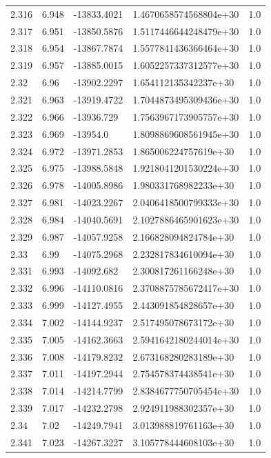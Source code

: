\begin{tabular}{lllll}
2.316 & 6.948 & -13833.4021 & 1.4670658574568804e+30 & 1.0 \\
2.317 & 6.951 & -13850.5876 & 1.5117446644248479e+30 & 1.0 \\
2.318 & 6.954 & -13867.7874 & 1.5577841436366464e+30 & 1.0 \\
2.319 & 6.957 & -13885.0015 & 1.6052257337312577e+30 & 1.0 \\
2.32 & 6.96 & -13902.2297 & 1.654112135342237e+30 & 1.0 \\
2.321 & 6.963 & -13919.4722 & 1.7044873495309436e+30 & 1.0 \\
2.322 & 6.966 & -13936.729 & 1.7563967173905757e+30 & 1.0 \\
2.323 & 6.969 & -13954.0 & 1.8098869608561945e+30 & 1.0 \\
2.324 & 6.972 & -13971.2853 & 1.865006224757619e+30 & 1.0 \\
2.325 & 6.975 & -13988.5848 & 1.9218041201530224e+30 & 1.0 \\
2.326 & 6.978 & -14005.8986 & 1.980331768982233e+30 & 1.0 \\
2.327 & 6.981 & -14023.2267 & 2.0406418500799333e+30 & 1.0 \\
2.328 & 6.984 & -14040.5691 & 2.1027886465901623e+30 & 1.0 \\
2.329 & 6.987 & -14057.9258 & 2.166828094824784e+30 & 1.0 \\
2.33 & 6.99 & -14075.2968 & 2.232817834610094e+30 & 1.0 \\
2.331 & 6.993 & -14092.682 & 2.300817261166248e+30 & 1.0 \\
2.332 & 6.996 & -14110.0816 & 2.3708875785672417e+30 & 1.0 \\
2.333 & 6.999 & -14127.4955 & 2.443091854828657e+30 & 1.0 \\
2.334 & 7.002 & -14144.9237 & 2.517495078673172e+30 & 1.0 \\
2.335 & 7.005 & -14162.3663 & 2.5941642180244014e+30 & 1.0 \\
2.336 & 7.008 & -14179.8232 & 2.673168280283189e+30 & 1.0 \\
2.337 & 7.011 & -14197.2944 & 2.754578374438541e+30 & 1.0 \\
2.338 & 7.014 & -14214.7799 & 2.8384677750705454e+30 & 1.0 \\
2.339 & 7.017 & -14232.2798 & 2.924911988302357e+30 & 1.0 \\
2.34 & 7.02 & -14249.7941 & 3.013988819761163e+30 & 1.0 \\
2.341 & 7.023 & -14267.3227 & 3.105778444608103e+30 & 1.0 \\

\end{tabular}
